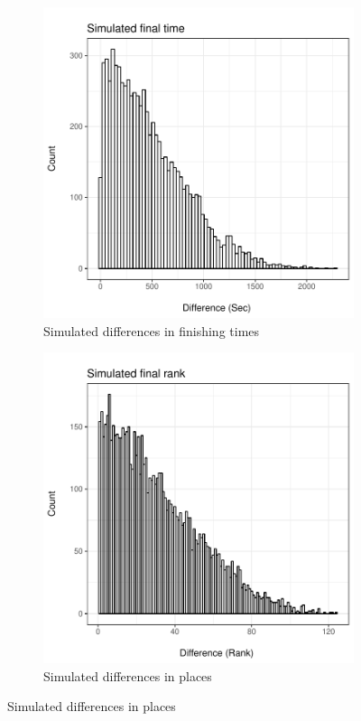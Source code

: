 \documentclass[12pt,titlepage]{article}
\begin{document}
\begin{figure}[!ht]
  \centering
  \caption{Distribution of simulated results for the Hahner twins}
  \label{fig:simdiff}
  \begin{subfigure}{.45\textwidth}
    \includegraphics[width=\textwidth,
    keepaspectratio]{simulated_time.pdf}
    \caption{Simulated differences in finishing times}
    \label{fig:simulatedfinishtimes}
  \end{subfigure}
  \begin{subfigure}{.45\textwidth}
    \includegraphics[width=\textwidth, keepaspectratio]{simulated_rank.pdf}
    \caption{Simulated differences in places}
    \label{fig:simulatedranks}
  \end{subfigure}
\end{figure}






   
\end{document}
